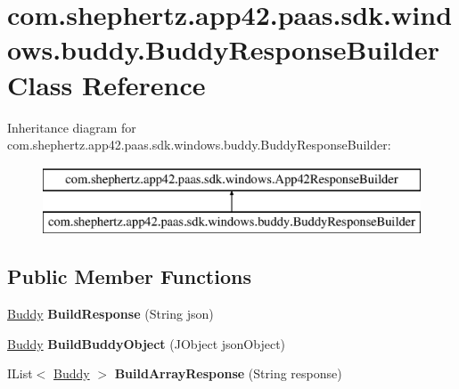 \hypertarget{classcom_1_1shephertz_1_1app42_1_1paas_1_1sdk_1_1windows_1_1buddy_1_1_buddy_response_builder}{\section{com.\+shephertz.\+app42.\+paas.\+sdk.\+windows.\+buddy.\+Buddy\+Response\+Builder Class Reference}
\label{classcom_1_1shephertz_1_1app42_1_1paas_1_1sdk_1_1windows_1_1buddy_1_1_buddy_response_builder}
}
Inheritance diagram for com.\+shephertz.\+app42.\+paas.\+sdk.\+windows.\+buddy.\+Buddy\+Response\+Builder\+:\begin{figure}[H]
\begin{center}
\leavevmode
\includegraphics[height=2.000000cm]{classcom_1_1shephertz_1_1app42_1_1paas_1_1sdk_1_1windows_1_1buddy_1_1_buddy_response_builder}
\end{center}
\end{figure}
\subsection*{Public Member Functions}
\begin{DoxyCompactItemize}
\item 
\hypertarget{classcom_1_1shephertz_1_1app42_1_1paas_1_1sdk_1_1windows_1_1buddy_1_1_buddy_response_builder_abb14dfb01a67a595ce4dfe78aa8b9476}{\hyperlink{classcom_1_1shephertz_1_1app42_1_1paas_1_1sdk_1_1windows_1_1buddy_1_1_buddy}{Buddy} {\bfseries Build\+Response} (String json)}\label{classcom_1_1shephertz_1_1app42_1_1paas_1_1sdk_1_1windows_1_1buddy_1_1_buddy_response_builder_abb14dfb01a67a595ce4dfe78aa8b9476}

\item 
\hypertarget{classcom_1_1shephertz_1_1app42_1_1paas_1_1sdk_1_1windows_1_1buddy_1_1_buddy_response_builder_a0cbd6634a84c238e16ce18297adb6121}{\hyperlink{classcom_1_1shephertz_1_1app42_1_1paas_1_1sdk_1_1windows_1_1buddy_1_1_buddy}{Buddy} {\bfseries Build\+Buddy\+Object} (J\+Object json\+Object)}\label{classcom_1_1shephertz_1_1app42_1_1paas_1_1sdk_1_1windows_1_1buddy_1_1_buddy_response_builder_a0cbd6634a84c238e16ce18297adb6121}

\item 
\hypertarget{classcom_1_1shephertz_1_1app42_1_1paas_1_1sdk_1_1windows_1_1buddy_1_1_buddy_response_builder_a76ae15a3f6398f30eb7e1e8f70998cc8}{I\+List$<$ \hyperlink{classcom_1_1shephertz_1_1app42_1_1paas_1_1sdk_1_1windows_1_1buddy_1_1_buddy}{Buddy} $>$ {\bfseries Build\+Array\+Response} (String response)}\label{classcom_1_1shephertz_1_1app42_1_1paas_1_1sdk_1_1windows_1_1buddy_1_1_buddy_response_builder_a76ae15a3f6398f30eb7e1e8f70998cc8}

\end{DoxyCompactItemize}
